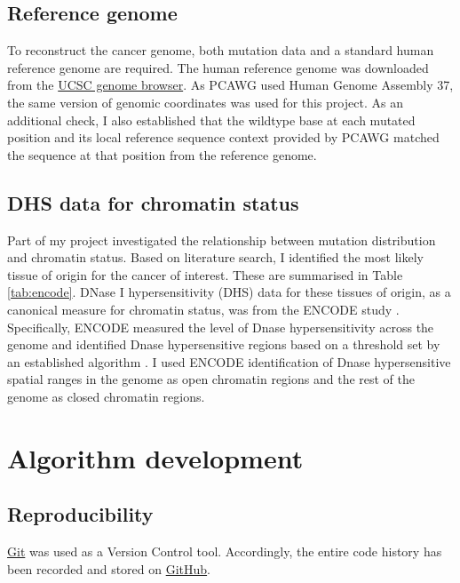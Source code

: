 \subsection{Reference genome} 
To reconstruct the cancer genome, both mutation data and a standard human reference genome are required. The human reference genome was downloaded from the \href{http://hgdownload.soe.ucsc.edu/goldenPath/hg19/chromosomes}{UCSC genome browser}. As PCAWG used Human Genome Assembly 37, the same version of genomic coordinates was used for this project. As an additional check, I also established that the wildtype base at each mutated position and its local reference sequence context provided by PCAWG matched the sequence at that position from the reference genome. 

\subsection{DHS data for chromatin status} 
Part of my project investigated the relationship between mutation distribution and chromatin status. Based on literature search, I identified the most likely tissue of origin for the cancer of interest. These are summarised in Table \ref{tab:encode}. DNase I hypersensitivity (DHS) data for these tissues of origin, as a canonical measure for chromatin status, was from the ENCODE study \citep[downloaded from either \href{https://genome.ucsc.edu/cgi-bin/hgFileUi?db=hg19&g=wgEncodeOpenChromDnase}{Duke} or \href{https://genome.ucsc.edu/cgi-bin/hgFileUi?db=hg19&g=wgEncodeUwDnase}{UW};][]{Thurman2012TheGenome,Klemm2019ChromatinEpigenome}. Specifically, ENCODE measured the level of Dnase hypersensitivity across the genome and identified Dnase hypersensitive regions based on a threshold set by an established algorithm \citep{Boyle2008High-ResolutionGenome}. I used ENCODE identification of Dnase hypersensitive spatial ranges in the genome as open chromatin regions and the rest of the genome as closed chromatin regions.

\section{Algorithm development}\label{methods:code}
\subsection{Reproducibility} 
\href{http://git-scm.com}{Git} was used as a Version Control tool. Accordingly, the entire code history has been recorded and stored on \href{https://github.com}{GitHub}.

